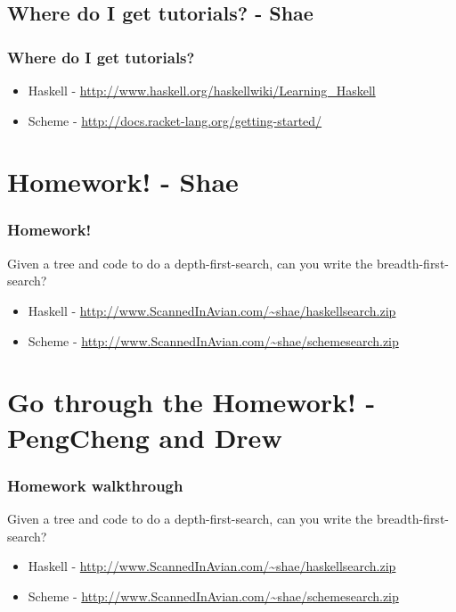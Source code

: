 \documentclass[xcolor=pdftex,dvipsnames,table]{beamer}
\begin{document}
\subsection{Where do I get tutorials? - Shae}
\begin{frame}
  \frametitle{Where do I get tutorials?}
  \begin{itemize}
  \item Haskell - \url{http://www.haskell.org/haskellwiki/Learning_Haskell}
  \item Scheme - \url{http://docs.racket-lang.org/getting-started/}
  \end{itemize}
\end{frame}

\section{Homework! - Shae}
\begin{frame}
  \frametitle{Homework!}
  Given a tree and code to do a depth-first-search, can you write the breadth-first-search?
  \begin{itemize}
  \item Haskell - \url{http://www.ScannedInAvian.com/~shae/haskellsearch.zip}
  \item Scheme - \url{http://www.ScannedInAvian.com/~shae/schemesearch.zip}
  \end{itemize}
\end{frame}


\section{Go through the Homework! - PengCheng and Drew}
\begin{frame}
  \frametitle{Homework walkthrough}
  Given a tree and code to do a depth-first-search, can you write the breadth-first-search?
  \begin{itemize}
  \item Haskell - \url{http://www.ScannedInAvian.com/~shae/haskellsearch.zip}
  \item Scheme - \url{http://www.ScannedInAvian.com/~shae/schemesearch.zip}
  \end{itemize}
\end{frame}
\end{document}
